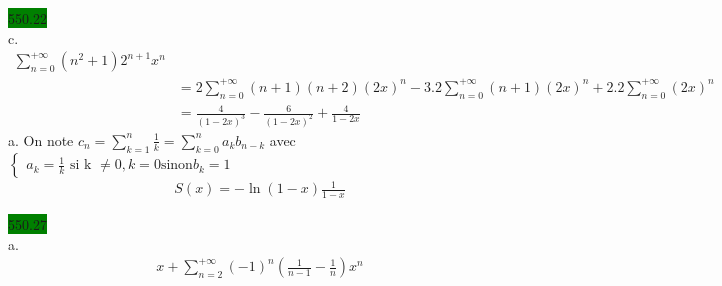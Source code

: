 \documentclass{article}
\begin{document}
\noindent \colorbox{green}{550.22}\\
c.
\begin{align*}
    \sum_{n=0}^{+\infty}(n^{2}+1)2^{n+1}x^{n}\\ 
    &= 2 \sum_{n=0}^{+\infty} (n+1)(n+2)(2x)^{n} - 3.2 \sum_{n=0}^{+\infty}(n+1)(2x)^{n} + 2.2 \sum_{n=0}^{+\infty}(2x)^{n} \\ 
    &= \frac{4}{(1-2x)^{3}}-\frac{6}{(1-2x)^{2}} + \frac{4}{1-2x}
\end{align*}
a. On note \(c_{n} = \sum_{k=1}^{n}\frac{1}{k} = \sum_{k=0}^{n}a_{k}b_{n-k}\)
avec \(
\begin{cases}
  a_{k} = \frac{1}{k} \text{ si k } \neq 0, k = 0 \text{sinon}
  b_{k} = 1
\end{cases}
\)
\begin{align*}
    S(x) = -\ln(1-x) \frac{1}{1-x}
\end{align*}

\noindent \colorbox{green}{550.27}\\
a. 
\begin{align*}
    x + \sum_{n=2}^{+\infty}(-1)^{n}(\frac{1}{n-1}-\frac{1}{n})x^{n}
\end{align*}
\end{document}

